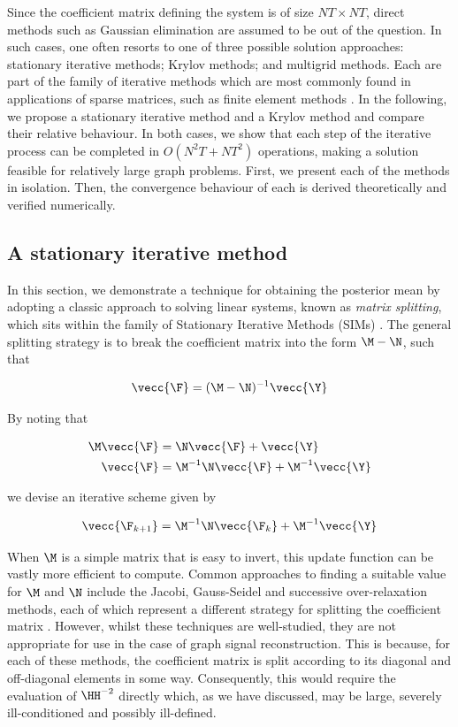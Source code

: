 Since the coefficient matrix defining the system is of size $NT \times NT $, direct methods such as Gaussian elimination are assumed to be out of the question. In such cases, one often resorts to one of three possible solution approaches: stationary iterative methods; Krylov methods; and multigrid methods. Each are part of the family of iterative methods which are most commonly found in applications of sparse matrices, such as finite element methods \citep{Brenner2008}. In the following, we propose a stationary iterative method and a Krylov method and compare their relative behaviour. In both cases, we show that each step of the iterative process can be completed in $O(N^2T + NT^2)$ operations, making a solution feasible for relatively large graph problems. First, we present each of the methods in isolation. Then, the convergence behaviour of each is derived theoretically and verified numerically.


\subsection{A stationary iterative method}

\label{sec:SIM}

In this section, we demonstrate a technique for obtaining the posterior mean by adopting a classic approach to solving linear systems, known as \textit{matrix splitting}, which sits within the family of Stationary Iterative Methods (SIMs) \citep{Saad2003}. The general splitting strategy is to break the coefficient matrix into the form $\M - \N$, such that 


\begin{equation}
    \vecc{\F} = (\M - \N)^{-1} \vecc{\Y}
\end{equation}

By noting that

\begin{align}
    \M \vecc{\F} &= \N \vecc{\F} + \vecc{\Y} \\
    \vecc{\F} &= \M^{-1}\N \vecc{\F} + \M^{-1} \vecc{\Y}
\end{align}

we devise an iterative scheme given by 

\begin{equation}
    \label{eq:sim_update}
    \vecc{\F_{k+1}} = \M^{-1}\N \vecc{\F_{k}} + \M^{-1} \vecc{\Y}
\end{equation}


When $\M$ is a simple matrix that is easy to invert, this update function can be vastly more efficient to compute. Common approaches to finding a suitable value for $\M$ and $\N$ include the Jacobi, Gauss-Seidel and successive over-relaxation methods, each of which represent a different strategy for splitting the coefficient matrix \citep{Saad2003}. However, whilst these techniques are well-studied, they are not appropriate for use in the case of graph signal reconstruction. This is because, for each of these methods, the coefficient matrix is split according to its diagonal and off-diagonal elements in some way. Consequently, this would require the evaluation of $\HH^{-2}$ directly which, as we have discussed, may be large, severely ill-conditioned and possibly ill-defined. 


